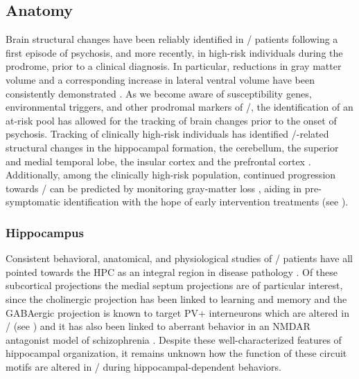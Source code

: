 \subsection{Anatomy}
Brain structural changes have been reliably identified in \scz/ patients following a first episode of psychosis, and more recently, in high-risk individuals during the prodrome, prior to a clinical diagnosis.
In particular, reductions in gray matter volume and a corresponding increase in lateral ventral volume have been consistently demonstrated \citep{Fusar-Poli2013, Shepherd2012}.
As we become aware of susceptibility genes, environmental triggers, and other prodromal markers of \scz/, the identification of an at-risk pool has allowed for the tracking of brain changes prior to the onset of psychosis.
Tracking of clinically high-risk individuals has identified \scz/-related structural changes in the hippocampal formation, the cerebellum, the superior and medial temporal lobe, the insular cortex and the prefrontal cortex \citep{Cannon2015, Millan2016}.
Additionally, among the clinically high-risk population, continued progression towards \scz/ can be predicted by monitoring gray-matter loss \citep{Tognin2014}, aiding in pre-symptomatic identification with the hope of early intervention treatments (see ).

\subsubsection{Hippocampus}
Consistent behavioral, anatomical, and physiological studies of \scz/ patients have all pointed towards the HPC as an integral region in disease pathology \citep{Boyer2007, Bogerts1985, Jakob1986}.
Of these subcortical projections the medial septum projections are of particular interest, since the cholinergic projection has been linked to learning and memory \citep{Parent2004} and the GABAergic projection is known to target PV+ interneurons \citep{Freund1988} which are altered in \scz/ (see ) and it has also been linked to aberrant behavior in an NMDAR antagonist model of schizophrenia \citep{Ma2012}.
Despite these well-characterized features of hippocampal organization, it remains unknown how the function of these circuit motifs are altered in \scz/ during hippocampal-dependent behaviors.


